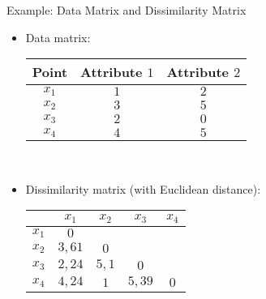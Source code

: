 \begin{frame}{Example: Data Matrix and Dissimilarity Matrix}
	\begin{itemize}
		\item Data matrix: \\[0.1cm]
		      \begin{tabular}{| c | c | c |}
			      \hline
			      Point & Attribute $1$ & Attribute $2$ \\\hline
			      $x_1$ & $1$           & $2$           \\\hline
			      $x_2$ & $3$           & $5$           \\\hline
			      $x_3$ & $2$           & $0$           \\\hline
			      $x_4$ & $4$           & $5$           \\\hline
		      \end{tabular}\\[0.5cm]
		\item Dissimilarity matrix (with Euclidean distance): \\[0.1cm]
		      \begin{tabular}{| c | c | c | c | c |}
			      \hline
			            & $x_1$  & $x_2$ & $x_3$  & $x_4$ \\\hline
			      $x_1$ & $0$    &       &        &       \\\hline
			      $x_2$ & $3,61$ & $0$   &        &       \\\hline
			      $x_3$ & $2,24$ & $5,1$ & $0$    &       \\\hline
			      $x_4$ & $4,24$ & $1$   & $5,39$ & $0$   \\\hline
		      \end{tabular}\\[0.2cm]
	\end{itemize}
\end{frame}

